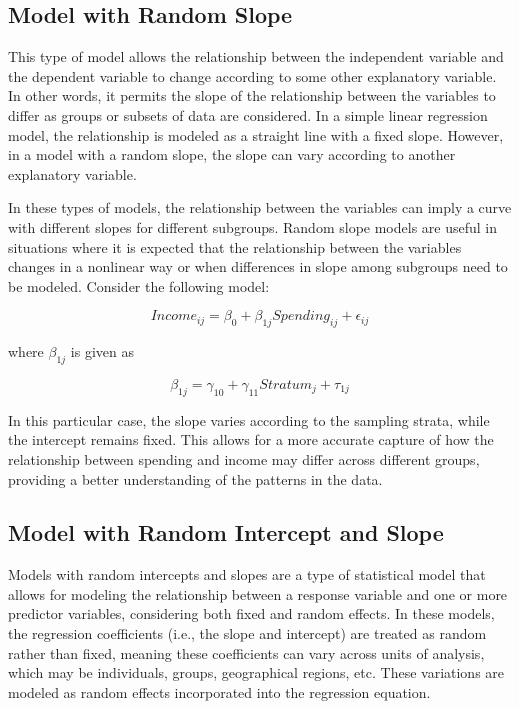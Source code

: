 \documentclass[
  12pt,
]{book}
\begin{document}
\hypertarget{model-with-random-slope}{%
\subsection{Model with Random Slope}\label{model-with-random-slope}}

This type of model allows the relationship between the independent variable and the dependent variable to change according to some other explanatory variable. In other words, it permits the slope of the relationship between the variables to differ as groups or subsets of data are considered. In a simple linear regression model, the relationship is modeled as a straight line with a fixed slope. However, in a model with a random slope, the slope can vary according to another explanatory variable.

In these types of models, the relationship between the variables can imply a curve with different slopes for different subgroups. Random slope models are useful in situations where it is expected that the relationship between the variables changes in a nonlinear way or when differences in slope among subgroups need to be modeled. Consider the following model:

\[
Income_{ij} = \beta_{0} + \beta_{1j} Spending_{ij} + \epsilon_{ij}
\]

where \(\beta_{1j}\) is given as

\[
\beta_{1j} = \gamma_{10} + \gamma_{11} Stratum_{j} + \tau_{1j}
\]

In this particular case, the slope varies according to the sampling strata, while the intercept remains fixed. This allows for a more accurate capture of how the relationship between spending and income may differ across different groups, providing a better understanding of the patterns in the data.

\hypertarget{model-with-random-intercept-and-slope}{%
\subsection{Model with Random Intercept and Slope}\label{model-with-random-intercept-and-slope}}

Models with random intercepts and slopes are a type of statistical model that allows for modeling the relationship between a response variable and one or more predictor variables, considering both fixed and random effects. In these models, the regression coefficients (i.e., the slope and intercept) are treated as random rather than fixed, meaning these coefficients can vary across units of analysis, which may be individuals, groups, geographical regions, etc. These variations are modeled as random effects incorporated into the regression equation.
\end{document}
